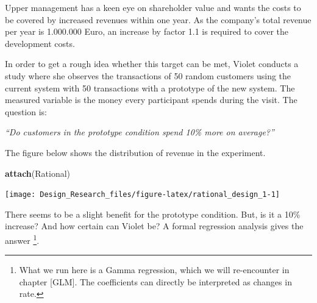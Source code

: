 \documentclass[]{svmono}
\newenvironment{Shaded}{\begin{snugshade}}{\end{snugshade}}
\newcommand{\KeywordTok}[1]{\textcolor[rgb]{0.13,0.29,0.53}{\textbf{#1}}}
\newcommand{\DataTypeTok}[1]{\textcolor[rgb]{0.13,0.29,0.53}{#1}}
\newcommand{\DecValTok}[1]{\textcolor[rgb]{0.00,0.00,0.81}{#1}}
\newcommand{\StringTok}[1]{\textcolor[rgb]{0.31,0.60,0.02}{#1}}
\newcommand{\OperatorTok}[1]{\textcolor[rgb]{0.81,0.36,0.00}{\textbf{#1}}}
\newcommand{\NormalTok}[1]{#1}
\begin{document}
Upper management has a keen eye on shareholder value and wants the costs
to be covered by increased revenues within one year. As the company's
total revenue per year is 1.000.000 Euro, an increase by factor 1.1 is
required to cover the development costs.

In order to get a rough idea whether this target can be met, Violet
conducts a study where she observes the transactions of 50 random
customers using the current system with 50 transactions with a prototype
of the new system. The measured variable is the money every participant
spends during the visit. The question is:

\emph{``Do customers in the prototype condition spend 10\% more on
average?''}

The figure below shows the distribution of revenue in the experiment.

\begin{Shaded}
\begin{Highlighting}[]
\KeywordTok{attach}\NormalTok{(Rational)}
\end{Highlighting}
\end{Shaded}

\begin{Shaded}
\end{Shaded}

\texttt{[image: Design\_Research\_files/figure-latex/rational\_design\_1-1]}

There seems to be a slight benefit for the prototype condition. But, is
it a 10\% increase? And how certain can Violet be? A formal regression
analysis gives the answer \footnote{What we run here is a Gamma
  regression, which we will re-encounter in chapter {[}GLM{]}. The
  coefficients can directly be interpreted as changes in rate.}.

\begin{Shaded}
\end{Shaded}
\end{document}
